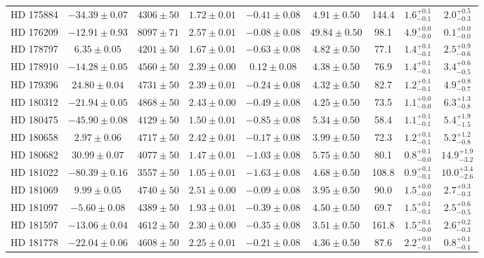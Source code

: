 \begin{table*}
\begin{tabular}{ccccccccc}
HD 175884 & $-34.39 \pm 0.07$ & $4306 \pm 50$ & $1.72 \pm 0.01$ & $-0.41 \pm 0.08$ & $4.91 \pm 0.50$ & 144.4 & $1.6^{+0.1}_{-0.1}$ & $2.0^{+0.5}_{-0.3}$ \\
HD 176209 & $-12.91 \pm 0.93$ & $8097 \pm 71$ & $2.57 \pm 0.01$ & $-0.08 \pm 0.08$ & $49.84 \pm 0.50$ & 98.1 & $4.9^{+0.0}_{-0.0}$ & $0.1^{+0.0}_{-0.0}$ \\
HD 178797 & $6.35 \pm 0.05$ & $4201 \pm 50$ & $1.67 \pm 0.01$ & $-0.63 \pm 0.08$ & $4.82 \pm 0.50$ & 77.1 & $1.4^{+0.1}_{-0.1}$ & $2.5^{+0.9}_{-0.6}$ \\
HD 178910 & $-14.28 \pm 0.05$ & $4560 \pm 50$ & $2.39 \pm 0.00$ & $0.12 \pm 0.08$ & $4.38 \pm 0.50$ & 76.9 & $1.4^{+0.1}_{-0.1}$ & $3.4^{+0.6}_{-0.5}$ \\
HD 179396 & $24.80 \pm 0.04$ & $4731 \pm 50$ & $2.39 \pm 0.01$ & $-0.24 \pm 0.08$ & $4.32 \pm 0.50$ & 82.7 & $1.2^{+0.1}_{-0.1}$ & $4.9^{+0.8}_{-0.7}$ \\
HD 180312 & $-21.94 \pm 0.05$ & $4868 \pm 50$ & $2.43 \pm 0.00$ & $-0.49 \pm 0.08$ & $4.25 \pm 0.50$ & 73.5 & $1.1^{+0.0}_{-0.0}$ & $6.3^{+1.3}_{-0.8}$ \\
HD 180475 & $-45.90 \pm 0.08$ & $4129 \pm 50$ & $1.50 \pm 0.01$ & $-0.85 \pm 0.08$ & $5.34 \pm 0.50$ & 58.4 & $1.1^{+0.1}_{-0.1}$ & $5.4^{+1.9}_{-1.5}$ \\
HD 180658 & $2.97 \pm 0.06$ & $4717 \pm 50$ & $2.42 \pm 0.01$ & $-0.17 \pm 0.08$ & $3.99 \pm 0.50$ & 72.3 & $1.2^{+0.1}_{-0.1}$ & $5.2^{+1.2}_{-0.8}$ \\
HD 180682 & $30.99 \pm 0.07$ & $4077 \pm 50$ & $1.47 \pm 0.01$ & $-1.03 \pm 0.08$ & $5.75 \pm 0.50$ & 80.1 & $0.8^{+0.1}_{-0.0}$ & $14.9^{+1.9}_{-3.2}$ \\
HD 181022 & $-80.39 \pm 0.16$ & $3557 \pm 50$ & $1.05 \pm 0.01$ & $-1.63 \pm 0.08$ & $4.68 \pm 0.50$ & 108.8 & $0.9^{+0.1}_{-0.1}$ & $10.0^{+3.4}_{-2.6}$ \\
HD 181069 & $9.99 \pm 0.05$ & $4740 \pm 50$ & $2.51 \pm 0.00$ & $-0.09 \pm 0.08$ & $3.95 \pm 0.50$ & 90.0 & $1.5^{+0.0}_{-0.0}$ & $2.7^{+0.3}_{-0.3}$ \\
HD 181097 & $-5.60 \pm 0.08$ & $4389 \pm 50$ & $1.93 \pm 0.01$ & $-0.39 \pm 0.08$ & $4.50 \pm 0.50$ & 69.7 & $1.5^{+0.1}_{-0.1}$ & $2.5^{+0.6}_{-0.5}$ \\
HD 181597 & $-13.06 \pm 0.04$ & $4612 \pm 50$ & $2.30 \pm 0.00$ & $-0.35 \pm 0.08$ & $3.51 \pm 0.50$ & 161.8 & $1.5^{+0.1}_{-0.0}$ & $2.6^{+0.2}_{-0.3}$ \\
HD 181778 & $-22.04 \pm 0.06$ & $4608 \pm 50$ & $2.25 \pm 0.01$ & $-0.21 \pm 0.08$ & $4.36 \pm 0.50$ & 87.6 & $2.2^{+0.0}_{-0.1}$ & $0.8^{+0.1}_{-0.1}$ \\

\end{tabular}
\end{table*}
